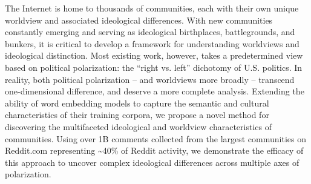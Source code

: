 The Internet is home to thousands of communities, each with their own unique worldview and associated ideological differences. With new communities constantly emerging and serving as ideological birthplaces, battlegrounds, and bunkers, it is critical to develop a framework for understanding worldviews and ideological distinction. Most existing work, however, takes a predetermined view based on political polarization: the ``right vs. left'' dichotomy of U.S. politics. In reality, both political polarization -- and worldviews more broadly -- transcend one-dimensional difference, and deserve a more complete analysis. Extending the ability of word embedding models to capture the semantic and cultural characteristics of their training corpora, we propose a novel method for discovering the multifaceted ideological and worldview characteristics of communities. Using over 1B comments collected from the largest communities on Reddit.com representing {\textasciitilde}40\% of Reddit activity, we demonstrate the efficacy of this approach to uncover complex ideological differences across multiple axes of polarization.
